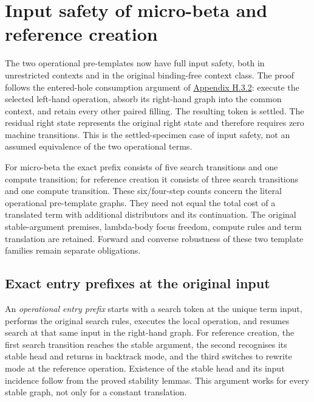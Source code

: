 \clearpage
\section{Input safety of micro-beta and reference creation}
\label{sec:copying-operational-safety}
The two operational pre-templates now have full input safety, both in
unrestricted contexts and in the original binding-free context class.
The proof follows the entered-hole consumption argument of
\href{https://arxiv.org/html/1907.01257v5\#A8.SS3.SSS2}{Appendix H.3.2}:
execute the selected left-hand operation, absorb its right-hand graph into
the common context, and retain every other paired filling. The resulting
token is settled. The residual right state represents the original right
state and therefore requires zero machine transitions. This is the
settled-specimen case of input safety, not an assumed
equivalence of the two operational terms.

For micro-beta the exact prefix consists of five search transitions and one
compute transition; for reference creation it consists of three search
transitions and one compute transition. These six/four-step counts concern
the literal operational pre-template graphs. They need not equal the total
cost of a translated term with additional distributors and its continuation.
The original stable-argument premises, lambda-body focus freedom, compute
rules and term translation are retained. Forward and converse robustness
of these two template families remain separate obligations.

\subsection{Exact entry prefixes at the original input}
An \emph{operational entry prefix} starts with a search token at the unique
term input, performs the original search rules, executes the local operation,
and resumes search at that same input in the right-hand graph.
For reference creation, the first search transition reaches the stable
argument, the second recognises its stable head and returns in backtrack
mode, and the third switches to rewrite mode at the reference operation.
Existence of the stable head and its input incidence follow from the
proved stability lemmas. This argument works for every stable graph,
not only for a constant translation.


